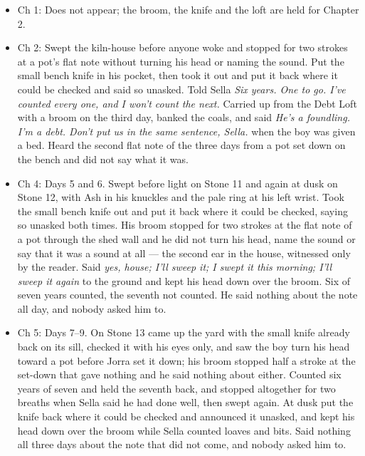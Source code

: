\documentclass{design/chronicle}
\begin{document}
{\begin{itemize}[leftmargin=1.4em,itemsep=1pt,topsep=3pt,parsep=0pt]
\item Ch 1: Does not appear; the broom, the knife and the loft are held for Chapter 2.

\item Ch 2: Swept the kiln-house before anyone woke and stopped for two strokes at a pot’s flat note without turning his head or naming the sound. Put the small bench knife in his pocket, then took it out and put it back where it could be checked and said so unasked. Told Sella \emph{Six years. One to go. I’ve counted every one, and I won’t count the next.} Carried up from the Debt Loft with a broom on the third day, banked the coals, and said \emph{He’s a foundling. I’m a debt. Don’t put us in the same sentence, Sella.} when the boy was given a bed. Heard the second flat note of the three days from a pot set down on the bench and did not say what it was.

\end{itemize}

\begin{itemize}[leftmargin=1.4em,itemsep=1pt,topsep=3pt,parsep=0pt]

\item Ch 4: Days 5 and 6. Swept before light on Stone 11 and again at dusk on Stone 12, with Ash in his knuckles and the pale ring at his left wrist. Took the small bench knife out and put it back where it could be checked, saying so unasked both times. His broom stopped for two strokes at the flat note of a pot through the shed wall and he did not turn his head, name the sound or say that it was a sound at all --- the second ear in the house, witnessed only by the reader. Said \emph{yes, house; I’ll sweep it; I swept it this morning; I’ll sweep it again} to the ground and kept his head down over the broom. Six of seven years counted, the seventh not counted. He said nothing about the note all day, and nobody asked him to.

\end{itemize}

\begin{itemize}[leftmargin=1.4em,itemsep=1pt,topsep=3pt,parsep=0pt]

\item Ch 5: Days 7--9. On Stone 13 came up the yard with the small knife already back on its sill, checked it with his eyes only, and saw the boy turn his head toward a pot before Jorra set it down; his broom stopped half a stroke at the set-down that gave nothing and he said nothing about either. Counted six years of seven and held the seventh back, and stopped altogether for two breaths when Sella said he had done well, then swept again. At dusk put the knife back where it could be checked and announced it unasked, and kept his head down over the broom while Sella counted loaves and bits. Said nothing all three days about the note that did not come, and nobody asked him to.


\end{itemize}}
\end{document}
